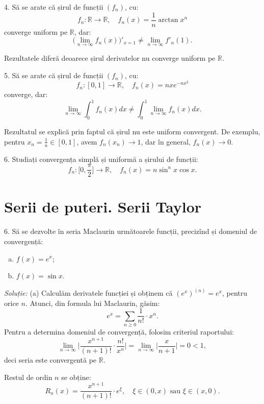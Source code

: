 \documentclass[11pt,a4paper]{article}
\newcommand\RR{\mathbb{R}}
\theoremstyle{dotless}
\theoremstyle{dotlessdr}
\begin{document}
\vspace{1cm}
4. Să se arate că șirul de funcții $(f_n)$, cu:
\[
  f_n : \RR \to \RR, \quad f_n(x) = \frac{1}{n} \arctan x^n
\]
converge uniform pe $\RR$, dar:
\[
  \Big( \lim_{n \to \infty} f_n(x) \Big)'_{x = 1} \neq \lim_{n \to \infty} f'_n(1).
\]

Rezultatele diferă deoarece șirul derivatelor nu converge uniform pe $\RR$.

\vspace{1cm}

5. Să se arate că șirul de funcții $(f_n)$, cu:
\[
  f_n : [0, 1] \to \RR, \quad f_n(x) = nxe^{-nx^2}
\]
converge, dar:
\[
  \lim_{n \to \infty} \int_0^1 f_n(x) dx \neq \int_0^1 \lim_{n \to \infty} f_n(x) dx.
\]

Rezultatul se explică prin faptul că șirul nu este uniform convergent. De exemplu,
pentru $x_n = \frac{1}{n} \in [0, 1]$, avem $f_n(x_n) \to 1$, dar în general,
$f_n(x) \to 0$.

\vspace{1cm}

6. Studiați convergența simplă și uniformă a șirului de funcții:
\[
  f_n : \Big[ 0, \frac{\pi}{2} \Big] \to \RR, \quad %
  f_n(x) = n \sin^n x \cos x.
\]

\section{Serii de puteri. Serii Taylor}
\label{sec:taylor}

6. Să se dezvolte în seria Maclaurin următoarele funcții, precizînd și
domeniul de convergență:
\begin{enumerate}[(a)]
\item $f(x) = e^x$;
\item $f(x) = \sin x$.
\end{enumerate}

\emph{Soluție:} (a) Calculăm derivatele funcției și obținem că $(e^x)^{(n)} = e^x$,
pentru orice $n$. Atunci, din formula lui Maclaurin, găsim:
\[
  e^x = \sum_{n \geq 0} \frac{1}{n!} \cdot x^n.
\]
Pentru a determina domeniul de convergență, folosim criteriul raportului:
\[
  \lim_{n \to \infty} \Big| \frac{x^{n+1}}{(n+1)!} \cdot \frac{n!}{x^n} \Big| = %
  \lim_{n \to \infty} \Big| \frac{x}{n+1} \Big| = 0 < 1,
\]
deci seria este convergentă pe $\RR$.

Restul de ordin $n$ se obține:
\[
  R_n(x) = \frac{x^{n + 1}}{(n + 1)!} \cdot e^{\xi}, \quad \xi \in (0, x) \text{ sau } %
  \xi \in (x, 0).
\]
\end{document}

